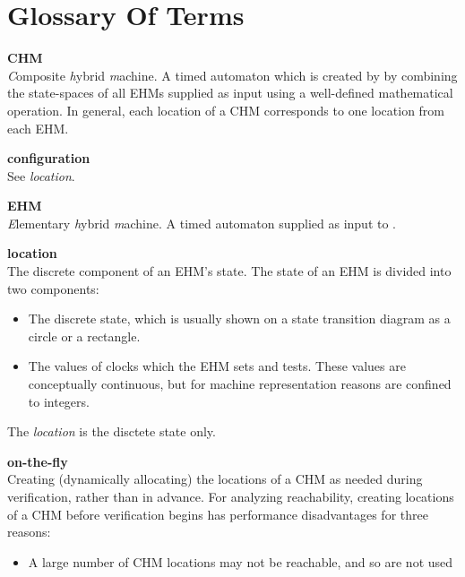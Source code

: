 %
\section{Glossary Of Terms}
\label{sglo0}

\begin{glossaryenum}
\item \textbf{CHM} \\
      \emph{C}omposite \emph{h}ybrid \emph{m}achine.  A timed automaton which is
      created by \swname{} by combining the state-spaces of all EHMs supplied as
      input using a well-defined mathematical operation.  In general, each location
      of a CHM corresponds to one location from each EHM.
\item \textbf{configuration} \\
      See \emph{location}.
\item \textbf{EHM} \\
      \emph{E}lementary \emph{h}ybrid \emph{m}achine.  A timed automaton supplied
      as input to \swname{}.
\item \textbf{location} \\
      The discrete component of an EHM's state.  The state of an EHM is divided into
      two components:
      \begin{itemize}
      \item The discrete state, which is usually shown on a state transition diagram
            as a circle or a rectangle.
      \item The values of clocks which the EHM sets and tests.  These values are
            conceptually continuous, but for machine representation reasons are
            confined to integers.
      \end{itemize}
      The \emph{location} is the disctete state only.
\item \textbf{on-the-fly} \\
      Creating (dynamically allocating) the locations of a CHM as needed during 
      verification, rather than in
      advance.  For analyzing reachability, creating locations of a CHM before verification
      begins has performance disadvantages for three reasons:
      \begin{itemize}
      \item A large number of CHM locations may not be reachable, and so are not used

\end{itemize}
\end{glossaryenum}
